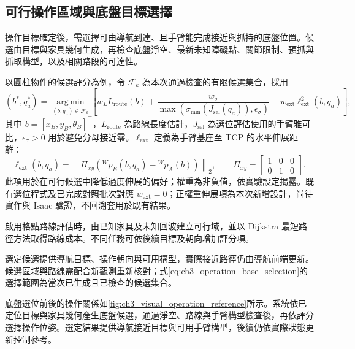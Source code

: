 \subsection{可行操作區域與底盤目標選擇}
\label{subsec:feasible_operation_base_selection}

操作目標確定後，需選擇可由導航到達、且手臂能完成接近與抓持的底盤位置。候選由目標與家具幾何生成，再檢查底盤淨空、最新未知障礙點、關節限制、預抓與抓取構型，以及相關路段的可達性。

以圓柱物件的候選評分為例，令 $\mathcal F_k$ 為本次通過檢查的有限候選集合，採用
\begin{equation}
    (b^{*},q_a^{*})
    =\underset{(b,q_a)\in\mathcal F_k}{\operatorname{arg\,min}}
      \left[
        w_L L_{\mathrm{route}}(b)
        +\frac{w_\sigma}
         {\max(\sigma_{\min}(J_{\mathrm{sel}}(q_a)),\epsilon_\sigma)}
        +w_{\mathrm{ext}}\ell_{\mathrm{ext}}^2(b,q_a)
      \right],
    \label{eq:ch3_operation_base_selection}
\end{equation}
其中 $b=[x_B,y_B,\theta_B]^{\top}$，$L_{\mathrm{route}}$ 為路線長度估計，$J_{\mathrm{sel}}$ 為選位評估使用的手臂雅可比，$\epsilon_\sigma>0$ 用於避免分母接近零。$\ell_{\mathrm{ext}}$ 定義為手臂基座至 TCP 的水平伸展距離：
\begin{equation}
    \ell_{\mathrm{ext}}(b,q_a)
    =\left\|\Pi_{xy}\left({}^{W}p_E(b,q_a)-{}^{W}p_A(b)\right)\right\|_2,
    \qquad
    \Pi_{xy}=\begin{bmatrix}1&0&0\\0&1&0\end{bmatrix}.
    \label{eq:ch3_operation_extension_cost}
\end{equation}
此項用於在可行候選中降低過度伸展的偏好；權重為非負值，依實驗設定揭露。既有選位程式及已完成對照批次對應 $w_{\mathrm{ext}}=0$；正權重伸展項為本次新增設計，尚待實作與 Isaac 驗證，不回溯套用於既有結果。

啟用格點路線評估時，由已知家具及未知回波建立可行域，並以 Dijkstra 最短路徑方法\cite{dijkstra1959note}取得路線成本。不同任務可依後續目標及朝向增加評分項。

選定候選提供導航目標、操作朝向與可用構型，實際接近路徑仍由導航前端更新。候選區域與路線需配合新觀測重新核對；式\eqref{eq:ch3_operation_base_selection}的選擇範圍為當次已生成且已檢查的候選集合。

底盤選位前後的操作關係如\cref{fig:ch3_visual_operation_reference}所示。系統依已定位目標與家具幾何產生底盤候選，通過淨空、路線與手臂構型檢查後，再依評分選擇操作位姿。選定結果提供導航接近目標與可用手臂構型，後續仍依實際狀態更新控制參考。

